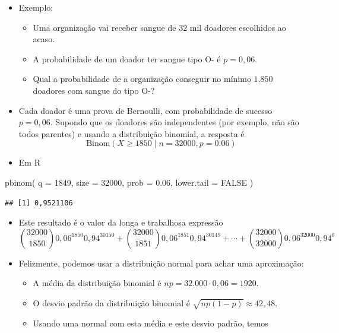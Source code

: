 \documentclass[
  11pt]{report}
\newenvironment{Shaded}{\begin{snugshade}}{\end{snugshade}}
\newcommand{\AttributeTok}[1]{\textcolor[rgb]{0.77,0.63,0.00}{#1}}
\newcommand{\ConstantTok}[1]{\textcolor[rgb]{0.00,0.00,0.00}{#1}}
\newcommand{\DecValTok}[1]{\textcolor[rgb]{0.00,0.00,0.81}{#1}}
\newcommand{\FloatTok}[1]{\textcolor[rgb]{0.00,0.00,0.81}{#1}}
\newcommand{\FunctionTok}[1]{\textcolor[rgb]{0.00,0.00,0.00}{#1}}
\newcommand{\NormalTok}[1]{#1}
\renewenvironment{Shaded}{
    \begin{mdframed}[%
      roundcorner=2pt,%
      innerleftmargin=5pt,%
      innerrightmargin=5pt,%
      topline=true,%
      leftline=true,%
      rightline=true,%
      bottomline=true,%
      linewidth=0.5pt,%
      linecolor=black!20,%
      backgroundcolor=black!2,%
      skipabove=2ex,%
      skipbelow=2.5ex%
    ]%
  }
  {
    \end{mdframed}
  }
\begin{document}
\begin{itemize}
\item
  Exemplo:

  \begin{itemize}
  \item
    Uma organização vai receber sangue de $32$ mil doadores escolhidos ao acaso.
  \item
    A probabilidade de um doador ter sangue tipo O- é $p = 0{,}06$.
  \item
    Qual a probabilidade de a organização conseguir no mínimo $1.850$ doadores com sangue do tipo O-?
  \end{itemize}
\item
  Cada doador é uma prova de Bernoulli, com probabilidade de sucesso $p = 0{,}06$. Supondo que os doadores são independentes (por exemplo, não são todos parentes) e usando a distribuição binomial, a resposta é
  \[
  \text{Binom}(X \geq 1850 \mid n = 32000, p = 0.06)
  \]
\item
  Em R
\end{itemize}

\begin{Shaded}
\begin{Highlighting}[]
\FunctionTok{pbinom}\NormalTok{(}
  \AttributeTok{q =} \DecValTok{1849}\NormalTok{,}
  \AttributeTok{size =} \DecValTok{32000}\NormalTok{,}
  \AttributeTok{prob =} \FloatTok{0.06}\NormalTok{,}
  \AttributeTok{lower.tail =} \ConstantTok{FALSE}
\NormalTok{)}
\end{Highlighting}
\end{Shaded}

\begin{verbatim}
## [1] 0,9521106
\end{verbatim}

\begin{itemize}
\item
  Este resultado é o valor da longa e trabalhosa expressão
  \[
  {32000 \choose 1850} 0{,}06^{1850} 0{,}94^{30150} + 
  {32000 \choose 1851} 0{,}06^{1851} 0{,}94^{30149} + \cdots +
  {32000 \choose 32000} 0{,}06^{32000} 0{,}94^{0}
  \]
\item
  Felizmente, podemos usar a distribuição normal para achar uma aproximação:

  \begin{itemize}
  \item
    A média da distribuição binomial é $np = 32.000 \cdot 0{,}06 = 1920$.
  \item
    O desvio padrão da distribuição binomial é $\sqrt{np(1-p)} \approx 42{,}48$.
  \item
    Usando uma normal com esta média e este desvio padrão, temos
  \end{itemize}
\end{itemize}
\end{document}
